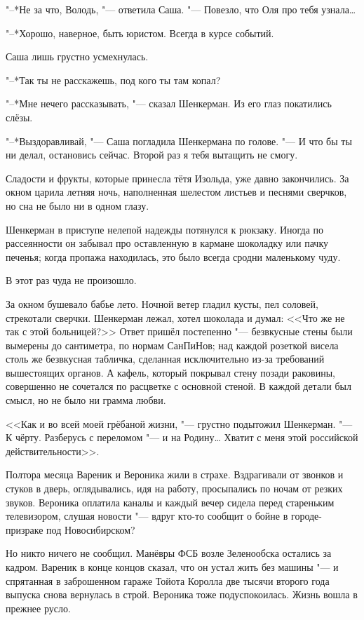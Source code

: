 "--*Не за что, Володь, "--- ответила Саша.
"--- Повезло, что Оля про тебя узнала\ldots{}

"--*Хорошо, наверное, быть юристом.
Всегда в курсе событий.

Саша лишь грустно усмехнулась.

"--*Так ты не расскажешь, под кого ты там копал?

"--*Мне нечего рассказывать, "--- сказал Шенкерман.
Из его глаз покатились слёзы.

"--*Выздоравливай, "--- Саша погладила Шенкермана по голове.
"--- И что бы ты ни делал, остановись сейчас.
Второй раз я тебя вытащить не смогу.

Сладости и фрукты, которые принесла тётя Изольда, уже давно закончились.
За окном царила летняя ночь, наполненная шелестом листьев и песнями сверчков, но сна не было ни в одном глазу.

Шенкерман в приступе нелепой надежды потянулся к рюкзаку.
Иногда по рассеянности он забывал про оставленную в кармане шоколадку или пачку печенья;
когда пропажа находилась, это было всегда сродни маленькому чуду.

В этот раз чуда не произошло.

За окном бушевало бабье лето.
Ночной ветер гладил кусты, пел соловей, стрекотали сверчки.
Шенкерман лежал, хотел шоколада и думал: <<Что же не так с этой больницей?>>
Ответ пришёл постепенно "--- безвкусные стены были вымерены до сантиметра, по нормам СанПиНов;
над каждой розеткой висела столь же безвкусная табличка, сделанная исключительно из-за требований вышестоящих органов.
А кафель, который покрывал стену позади раковины, совершенно не сочетался по расцветке с основной стеной.
В каждой детали был смысл, но не было ни грамма любви.

<<Как и во всей моей грёбаной жизни, "--- грустно подытожил Шенкерман.
"--- К чёрту.
Разберусь с переломом "--- и на Родину\ldots{}
Хватит с меня этой российской действительности>>.

\asterism

Полтора месяца Вареник и Вероника жили в страхе.
Вздрагивали от звонков и стуков в дверь, оглядывались, идя на работу, просыпались по ночам от резких звуков.
Вероника оплатила каналы и каждый вечер сидела перед стареньким телевизором, слушая новости "--- вдруг кто-то сообщит о бойне в городе-призраке под Новосибирском?

Но никто ничего не сообщил.
Манёвры ФСБ возле Зеленообска остались за кадром.
Вареник в конце концов сказал, что он устал жить без машины "--- и спрятанная в заброшенном гараже Тойота Королла две тысячи второго года выпуска снова вернулась в строй.
Вероника тоже подуспокоилась.
Жизнь вошла в прежнее русло.

